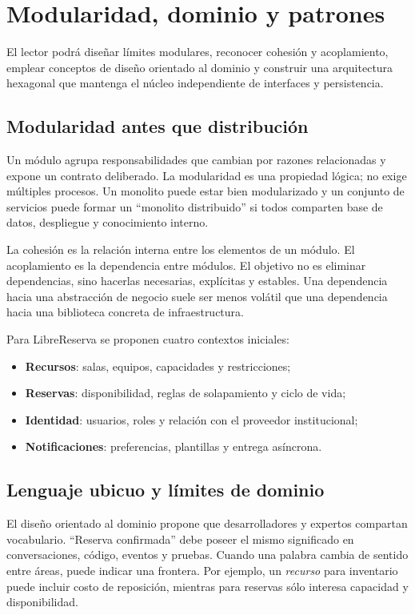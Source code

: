 \chapter{Modularidad, dominio y patrones}

\begin{objetivos}
El lector podrá diseñar límites modulares, reconocer cohesión y acoplamiento, emplear conceptos de diseño orientado al dominio y construir una arquitectura hexagonal que mantenga el núcleo independiente de interfaces y persistencia.
\end{objetivos}

\section{Modularidad antes que distribución}
Un módulo agrupa responsabilidades que cambian por razones relacionadas y expone un contrato deliberado. La modularidad es una propiedad lógica; no exige múltiples procesos. Un monolito puede estar bien modularizado y un conjunto de servicios puede formar un ``monolito distribuido'' si todos comparten base de datos, despliegue y conocimiento interno.

La cohesión es la relación interna entre los elementos de un módulo. El acoplamiento es la dependencia entre módulos. El objetivo no es eliminar dependencias, sino hacerlas necesarias, explícitas y estables. Una dependencia hacia una abstracción de negocio suele ser menos volátil que una dependencia hacia una biblioteca concreta de infraestructura.

Para LibreReserva se proponen cuatro contextos iniciales:
\begin{itemize}
  \item \textbf{Recursos}: salas, equipos, capacidades y restricciones;
  \item \textbf{Reservas}: disponibilidad, reglas de solapamiento y ciclo de vida;
  \item \textbf{Identidad}: usuarios, roles y relación con el proveedor institucional;
  \item \textbf{Notificaciones}: preferencias, plantillas y entrega asíncrona.
\end{itemize}

\section{Lenguaje ubicuo y límites de dominio}
El diseño orientado al dominio propone que desarrolladores y expertos compartan vocabulario. ``Reserva confirmada'' debe poseer el mismo significado en conversaciones, código, eventos y pruebas. Cuando una palabra cambia de sentido entre áreas, puede indicar una frontera. Por ejemplo, un \emph{recurso} para inventario puede incluir costo de reposición, mientras para reservas sólo interesa capacidad y disponibilidad.

